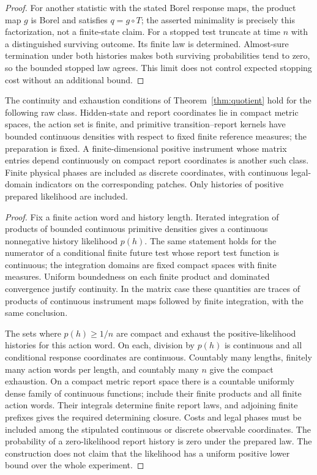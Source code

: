 \begin{proof}
For another statistic with the stated Borel response maps, the product map $g$ is Borel and satisfies $q=g\circ T$; the asserted minimality is precisely this factorization, not a finite-state claim. For a stopped test truncate at time $n$ with a distinguished surviving outcome. Its finite law is determined. Almost-sure termination under both histories makes both surviving probabilities tend to zero, so the bounded stopped law agrees. This limit does not control expected stopping cost without an additional bound.
\end{proof}

\begin{proposition}\label{prop:raw-quotient}
The continuity and exhaustion conditions of Theorem~\ref{thm:quotient} hold for the following raw class. Hidden-state and report coordinates lie in compact metric spaces, the action set is finite, and primitive transition--report kernels have bounded continuous densities with respect to fixed finite reference measures; the preparation is fixed. A finite-dimensional positive instrument whose matrix entries depend continuously on compact report coordinates is another such class. Finite physical phases are included as discrete coordinates, with continuous legal-domain indicators on the corresponding patches. Only histories of positive prepared likelihood are included.
\end{proposition}
\begin{proof}
Fix a finite action word and history length. Iterated integration of products of bounded continuous primitive densities gives a continuous nonnegative history likelihood $p(h)$. The same statement holds for the numerator of a conditional finite future test whose report test function is continuous; the integration domains are fixed compact spaces with finite measures. Uniform boundedness on each finite product and dominated convergence justify continuity. In the matrix case these quantities are traces of products of continuous instrument maps followed by finite integration, with the same conclusion.

The sets where $p(h)\ge1/n$ are compact and exhaust the positive-likelihood histories for this action word. On each, division by $p(h)$ is continuous and all conditional response coordinates are continuous. Countably many lengths, finitely many action words per length, and countably many $n$ give the compact exhaustion. On a compact metric report space there is a countable uniformly dense family of continuous functions; include their finite products and all finite action words. Their integrals determine finite report laws, and adjoining finite prefixes gives the required determining closure. Costs and legal phases must be included among the stipulated continuous or discrete observable coordinates. The probability of a zero-likelihood report history is zero under the prepared law. The construction does not claim that the likelihood has a uniform positive lower bound over the whole experiment.
\end{proof}

